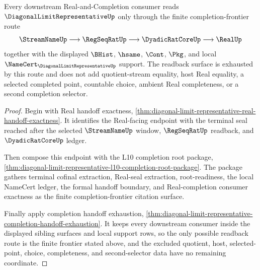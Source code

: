 \begin{theorem}
\label{thm:diagonal-limit-representative-completion-frontier-readback-coverage}
Every downstream Real-and-Completion consumer reads $\DiagonalLimitRepresentativeUp$ only through the finite completion-frontier route
$$
\StreamNameUp \longrightarrow \RegSeqRatUp \longrightarrow \DyadicRatCoreUp \longrightarrow \RealUp
$$
together with the displayed $\BHist$, $\hsame$, $\Cont$, $\Pkg$, and local $\NameCert_{\DiagonalLimitRepresentativeUp}$ support. The readback surface is exhausted by this route and does not add quotient-stream equality, host Real equality, a selected completed point, countable choice, ambient Real completeness, or a second completion selector.
\end{theorem}
\begin{proof}
Begin with Real handoff exactness, \autoref{thm:diagonal-limit-representative-real-handoff-exactness}. It identifies the Real-facing endpoint with the terminal seal reached after the selected $\StreamNameUp$ window, $\RegSeqRatUp$ readback, and $\DyadicRatCoreUp$ ledger.

Then compose this endpoint with the L10 completion root package, \autoref{thm:diagonal-limit-representative-l10-completion-root-package}. The package gathers terminal cofinal extraction, Real-seal extraction, root-readiness, the local NameCert ledger, the formal handoff boundary, and Real-completion consumer exactness as the finite completion-frontier citation surface.

Finally apply completion handoff exhaustion, \autoref{thm:diagonal-limit-representative-completion-handoff-exhaustion}. It keeps every downstream consumer inside the displayed sibling surfaces and local support rows, so the only possible readback route is the finite frontier stated above, and the excluded quotient, host, selected-point, choice, completeness, and second-selector data have no remaining coordinate.
\end{proof}
